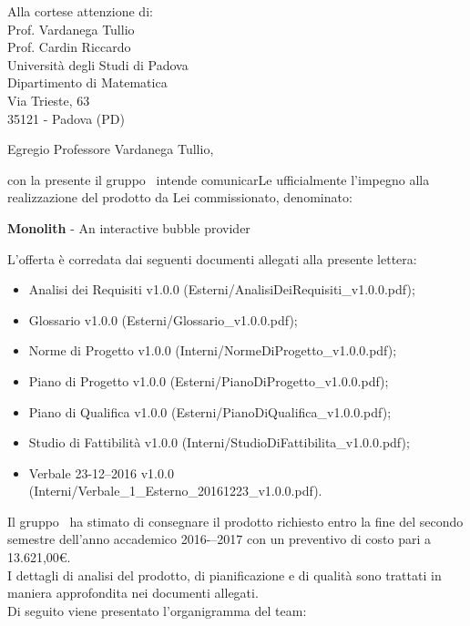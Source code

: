 

\newcommand{\logo}{../../Template/Logo/Logo.png}
\newcommand{\data}{\today}
\newcommand{\oggetto}{Presentazione della proposta per il capitolato d'appalto C5.}
\newcommand{\mittente}{Riccardo Montagnin \\ Responsabile NPE Developers}
\newcommand{\firma}{../../Template/Firme/RM.png}





\begin{letter}{Alla cortese attenzione di: \\
 Prof. Vardanega Tullio \\
 Prof. Cardin Riccardo \\
 Università degli Studi di Padova \\
 Dipartimento di Matematica \\
 Via Trieste, 63 \\
 35121 - Padova (PD)}

\opening{Egregio Professore Vardanega Tullio,} 

con la presente il gruppo \gruppo\ intende comunicarLe ufficialmente l'impegno alla realizzazione del prodotto da Lei commissionato, denominato:
\begin{center}
\textbf{Monolith} - An interactive bubble provider
\end{center}
L'offerta è corredata dai seguenti documenti allegati alla presente lettera:
\begin{itemize}
	\item  Analisi dei Requisiti v1.0.0 (Esterni/AnalisiDeiRequisiti\_v1.0.0.pdf);
	\item  Glossario v1.0.0 (Esterni/Glossario\_v1.0.0.pdf);
	\item  Norme di Progetto v1.0.0 (Interni/NormeDiProgetto\_v1.0.0.pdf);
	\item  Piano di Progetto v1.0.0 (Esterni/PianoDiProgetto\_v1.0.0.pdf);
	\item  Piano di Qualifica v1.0.0 (Esterni/PianoDiQualifica\_v1.0.0.pdf);
	\item  Studio di Fattibilità v1.0.0 (Interni/StudioDiFattibilita\_v1.0.0.pdf);
	\item  Verbale 23-12--2016 v1.0.0 (Interni/Verbale\_1\_Esterno\_20161223\_v1.0.0.pdf).
\end{itemize}

Il gruppo \gruppo\ ha stimato di consegnare il prodotto richiesto entro la fine del secondo semestre dell'anno accademico 2016-–2017 con un preventivo di costo pari a 13.621,00\euro. \\
I dettagli di analisi del prodotto, di pianificazione e di qualità sono trattati in maniera approfondita nei documenti allegati. \\
Di seguito viene presentato l'organigramma del team:


\end{letter}
